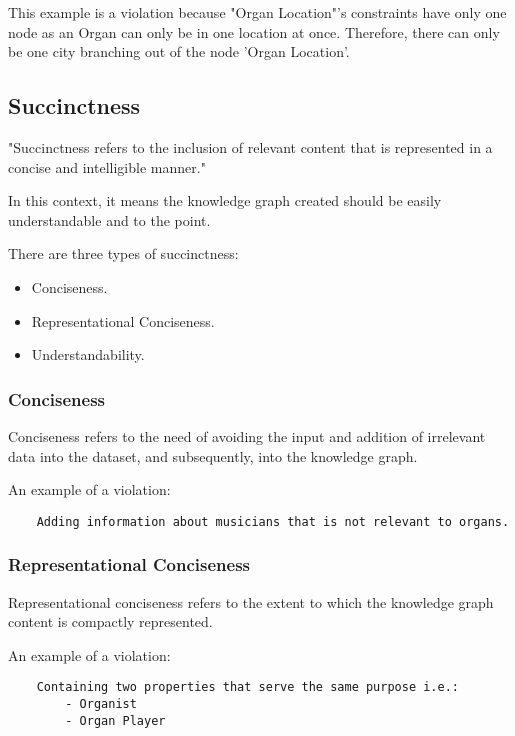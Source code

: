 This example is a violation because "Organ Location"'s constraints have only one node as an Organ can only be in one location at once. Therefore, there can only be one city branching out of the node 'Organ Location'.

\subsection{Succinctness}
\hspace{0.5cm} "Succinctness refers to the inclusion of relevant content that is represented in a concise and intelligible manner." \cite{knowledgegraphevaulationbook}

In this context, it means the knowledge graph created should be easily understandable and to the point. 

There are three types of succinctness: 
\begin{itemize}
\item Conciseness.
\item Representational Conciseness.
\item Understandability.
\end{itemize}

\subsubsection{Conciseness}
\hspace{0.5cm} Conciseness refers to the need of avoiding the input and addition of irrelevant data into the dataset, and subsequently, into the knowledge graph. \cite{knowledgegraphevaulationbook}

An example of a violation: 
\begin{lstlisting}
    Adding information about musicians that is not relevant to organs.
\end{lstlisting}

\subsubsection{Representational Conciseness}
\hspace{0.5cm} Representational conciseness refers to the extent to which the knowledge graph content is compactly represented. \cite{knowledgegraphevaulationbook}

An example of a violation: 
\begin{lstlisting}
    Containing two properties that serve the same purpose i.e.:
        - Organist
        - Organ Player
\end{lstlisting}
\begin{center}
\end{center}

